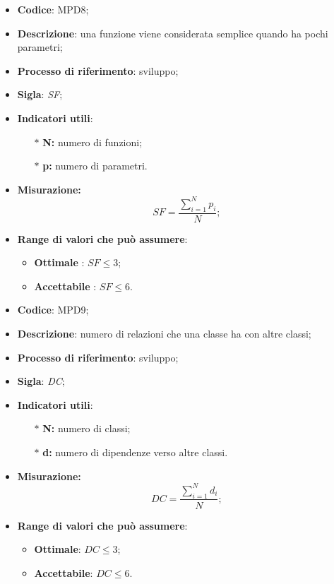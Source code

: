 \vspace{-1cm}
\begin{itemize}
	\item \textbf{Codice}: MPD8;
	\item \textbf{Descrizione}: una funzione viene considerata semplice quando ha pochi parametri;
	\item \textbf{Processo di riferimento}: sviluppo;
	\item \textbf{Sigla}: \textit{SF};
	\item \textbf{Indicatori utili}: 
		\begin{itemize}
		\item[$\ast$] \textbf{N:} numero di funzioni;
		\item[$\ast$] \textbf{p:} numero di parametri.
		\end{itemize}
	\item \textbf{Misurazione:} \[SF=\frac{\sum_{i=1}^{N} p_i}{N};\]
	\item \textbf{Range di valori che può assumere}: 
		\begin{itemize}
			\item \textbf{Ottimale} : $SF \leq 3$;
			\item \textbf{Accettabile} : $SF \leq 6$.
		\end{itemize}
\end{itemize}

\vspace{-1cm}
\begin{itemize}
	\item \textbf{Codice}: MPD9;
	\item \textbf{Descrizione}: numero di relazioni che una classe ha con altre classi;
	\item \textbf{Processo di riferimento}: sviluppo;
	\item \textbf{Sigla}: \textit{DC};
	\item \textbf{Indicatori utili}: 
		\begin{itemize}
		\item[$\ast$] \textbf{N:} numero di classi;
		\item[$\ast$] \textbf{d:} numero di dipendenze verso altre classi.
		\end{itemize}
	\item \textbf{Misurazione:} \[DC=\frac{\sum_{i=1}^{N} d_i}{N};\]
	\item \textbf{Range di valori che può assumere}:
		\begin{itemize}
			\item \textbf{Ottimale}: $DC \leq 3 $;
			\item \textbf{Accettabile}: $DC \leq 6 $.
		\end{itemize}
\end{itemize}
